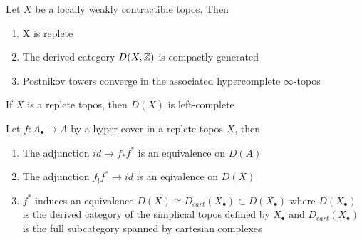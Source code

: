 \documentclass{article}
\begin{document}
\begin{proposition}
    Let $X$ be a locally weakly contractible topos. Then
    \begin{enumerate}
        \item X is replete
        \item The derived category $D(X,\mathbb{Z})$ is compactly generated
        \item Postnikov towers converge in the associated hypercomplete $\infty$-topos
    \end{enumerate}
\end{proposition}

\begin{proposition}
    If $X$ is a replete topos, then $D(X)$ is left-complete
\end{proposition}
\begin{proposition}
    Let $f\colon A_\bullet \to A$ by a hyper cover in a replete topos $X$, then
    \begin{enumerate}
        \item The adjunction $id \to f_* f^*$ is an equivalence on $D(A)$
        \item The adjunction $f_! f^* \to id$ is an eqivalence on $D(X)$
        \item $f^*$ induces an equivalence $D(X) \cong D_{cart}(X_\bullet)\subset D(X_\bullet)$ where $D(X_\bullet)$ is the derived category of the simplicial topos defined by $X_\bullet$ and $D_{cart}(X_\bullet)$ is the full subcategory spanned by cartesian complexes 
    \end{enumerate}
\end{proposition}

\pagebreak 
\end{document}
